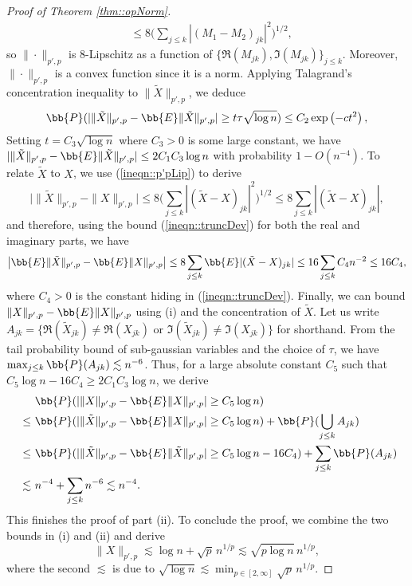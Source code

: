\documentclass[12pt]{article}%
\theoremstyle{plain}%
\theoremstyle{remark}
\begin{document}
\begin{proof}[Proof of Theorem \ref{thm::opNorm}]
\begin{align}
&\le 8 \big( \sum_{j \le k} |(M_1 - M_2)_{jk} |^2 \big)^{1/2}, \label{ineqn::p'pLip}
\end{align}
so $\| \cdot \|_{p',p}$ is $8$-Lipschitz as a function of $\{ \Re(M_{jk}), \Im(M_{jk}) \}_{j \le k}$. Moreover, $\| \cdot \|_{p',p}$ is a convex function since it is a norm. Applying Talagrand's concentration inequality \citep{Tal95} to $\| \tilde{X} \|_{p',p}$, we deduce 
\begin{equation*}
\bb{P}( | \| \tilde{X} \|_{p',p} - \bb{E} \|  \tilde{X} \|_{p',p} | \ge t\tau \sqrt{\log n} ) \le C_2 \exp \left( -c t^2 \right),
\end{equation*}
Setting $t = C_3\sqrt{\log n}$ where $C_3 > 0$ is some large constant, we have $ | \| \tilde{X} \|_{p',p} - \bb{E} \|  \tilde{X} \|_{p',p} | \le 2C_1C_3 \log n$ with probability $1 - O(n^{-4})$. To relate $\tilde{X}$ to $X$, we use (\ref{ineqn::p'pLip}) to derive 
\begin{equation*}
\big|  \|  \tilde{X} \|_{p',p} -  \|  X\|_{p',p} \big| \le 8 \big( \sum_{j \le k} |(\tilde{X} - X)_{jk} |^2 \big)^{1/2} \le 8  \sum_{j \le k}|(\tilde{X} - X)_{jk} |,
\end{equation*}
and therefore, using the bound (\ref{ineqn::truncDev}) for both the real and imaginary parts, we have
\begin{equation*}
\big| \bb{E} \|  \tilde{X} \|_{p',p} - \bb{E} \| X \|_{p',p} \big| \le 8 \sum_{j \le k} \bb{E} |(\tilde{X} - X)_{jk} | \le 16\sum_{j \le k}  C_4 n^{-2} \le  16C_4,
\end{equation*}
where $C_4 > 0$ is the constant hiding in (\ref{ineqn::truncDev}). Finally, we can bound $\| X \|_{p',p} - \bb{E} \| X \|_{p',p}$ using (i) and the concentration of $\tilde{X}$. Let us write $A_{jk} = \{ \Re(\tilde{X}_{jk}) \neq \Re(X_{jk}) \text{ or } \Im(\tilde{X}_{jk}) \neq \Im(X_{jk}) \}$ for shorthand. From the tail probability bound of sub-gaussian variables and the choice of $\tau$, we have $\max_{j\le k} \bb{P}(A_{jk}) \lesssim n^{-6}$. Thus, for a large absolute constant $C_5$ such that $C_5 \log n - 16C_4 \ge 2C_1C_3 \log n$, we derive
\begin{align*}
~~~~ & ~  \bb{P}(  | \| X \|_{p',p} - \bb{E} \| X \|_{p',p} | \ge C_5 \log n ) \\
\le& ~  \bb{P}(  | \| \tilde{X} \|_{p',p} - \bb{E} \| X \|_{p',p} | \ge C_5 \log n ) + \bb{P}( \bigcup_{j \le k} A_{jk} ) \\
\le & ~ \bb{P}( | \| \tilde{X} \|_{p',p} - \bb{E} \| \tilde{X} \|_{p',p} | \ge C_5 \log n - 16C_4 ) + \sum_{j \le k} \bb{P}(A_{jk}) \\
\lesssim & ~ n^{-4} + \sum_{j \le k} n^{-6} \lesssim n^{-4}.
\end{align*} 
This finishes the proof of part (ii). To conclude the proof, we combine the two bounds in (i) and (ii) and derive
\begin{equation*}
\| X \|_{p',p} \lesssim \log n + \sqrt{p}\, n^{1/p} \lesssim \sqrt{p \log n}\, n^{1/p},
\end{equation*}
where the second $\lesssim$ is due to $\sqrt{\log n} \lesssim \min_{p \in [2,\infty]}  \sqrt{p}\, n^{1/p}$.
\end{proof}
\end{document}
